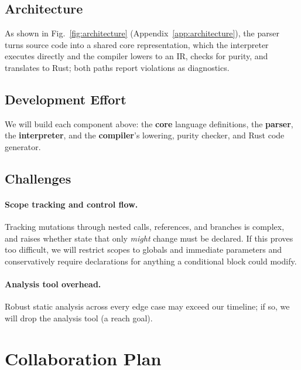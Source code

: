 \documentclass[12pt, letterpaper]{article}
\begin{document}
\subsection{Architecture}

As shown in Fig.~\ref{fig:architecture} (Appendix~\ref{app:architecture}), the parser turns source code into a shared core representation, which the interpreter executes directly and the compiler lowers to an IR, checks for purity, and translates to Rust; both paths report violations as diagnostics.

\subsection{Development Effort}
We will build each component above: the \textbf{core} language definitions, the \textbf{parser}, the \textbf{interpreter}, and the \textbf{compiler}'s lowering, purity checker, and Rust code generator.

\subsection{Challenges}
\paragraph{Scope tracking and control flow.}
Tracking mutations through nested calls, references, and branches is complex, and raises whether state that only \emph{might} change must be declared.
If this proves too difficult, we will restrict scopes to globals and immediate parameters and conservatively require declarations for anything a conditional block could modify.

\paragraph{Analysis tool overhead.}
Robust static analysis across every edge case may exceed our timeline; if so, we will drop the analysis tool (a reach goal).

\section{Collaboration Plan}
\end{document}
